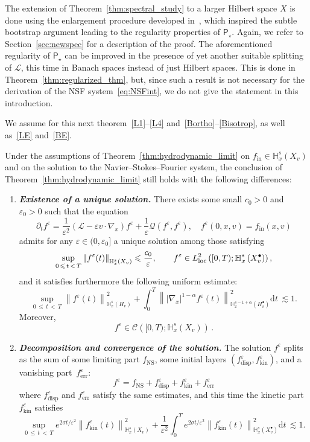 \documentclass[AHL,Unicode,longabstracts,published]{cedram}
\newcommand{\ini}{\mathrm{in}}
\newcommand{\err}{\mathrm{err}}
\newcommand{\ns}{\mathrm{NS}}
\newcommand{\kin}{\mathrm{kin}}
\renewcommand{\d}{\mathrm{d}}
\newcommand{\disp}{\mathrm{disp}}
\newcommand{\bbH}{\mathbb{H}}
\newcommand{\CC}{\mathcal{C}}
\newcommand{\LL}{\mathcal{L}}
\newcommand{\PP}{\mathsf{P}}
\newcommand{\QQ}{\mathcal{Q}}
\newcommand{\Ss}{H}
\newcommand{\Ssp}{H^{\bullet}}
\newcommand{\Sl}{X}
\newcommand{\Slp}{X^{\bullet}}
\renewcommand*\le{\leqslant}
\newcommand*\eps{{\varepsilon}}
\newcommand*{\relabel}{\renewcommand{\labelenumi}{(\theenumi)}}
\newcommand*{\bfenumi}{\renewcommand*{\theenumi}{\textit{\textbf{\arabic{enumi}}}}\relabel}
\begin{document}
The extension of Theorem~\ref{thm:spectral_study} to a larger Hilbert space $\Sl$ is done using the enlargement procedure developed in~\cite{GMM2017}, which inspired the subtle bootstrap argument leading to the regularity properties of $\PP_\star$. Again, we refer to Section~\ref{sec:newspec} for a description of the proof. {The aforementioned regularity of $\PP_\star$ can be improved in the presence of yet another suitable splitting of $\LL$, this time in Banach spaces instead of just Hilbert spaces}. This is done in Theorem~\ref{thm:regularized_thm}, but, since such a result is not necessary for the derivation of the NSF system~\eqref{eq:NSFint}, we do not give the statement in this introduction.

We assume for this next theorem~\eqref{L1}--\eqref{L4} and~\eqref{Bortho}--\eqref{Bisotrop}, as well as~\eqref{LE} and~\eqref{BE}.

\begin{theo}\label{thm:hydrodynamic_limit-gen_symmetric}
Under the assumptions of Theorem~\ref{thm:hydrodynamic_limit} {on $f_\ini \in \bbH^s_x \left(\Sl_v \right)$} and on the solution to the Navier--Stokes--Fourier system, {the conclusion of Theorem~\ref{thm:hydrodynamic_limit} still holds with the following differences:}
\begin{enumerate}\bfenumi
\item\label{theo1.20.1} \textit{\textbf{Existence of a unique solution.}} There exists some small $c_0 > 0$ and $\eps_0 > 0$ such that the equation
\[
\partial_t f^\eps = \frac{1}{\eps^2} \left(\LL - \eps v \cdot \nabla_x \right) f^\eps + \frac{1}{\eps} \QQ\left(f^\eps, f^\eps \right), \quad f^\eps(0, x, v) = f_\ini(x, v)
\]
admits for any $\eps \in (0, \eps_0]$ a unique solution among those satisfying
\[
\sup_{0\, \le\,t\,<\,T} \left\| f^\eps(t) \right\|_{ \bbH^s_x \left(\Sl_v \right) } \le \frac{c_0}{\eps}, \qquad f^\eps \in L^2_{\rm{loc}} \left([0, T) ; \bbH^s_x \left(\Slp_v\right) \right),
\]
and it satisfies furthermore the following uniform estimate:
\[
\sup_{0\,\le\,t\,<\,T} \left\| f^\eps(t) \right\|_{ \bbH^s_x \left(\Ss_v \right) }^2 + \int_0^T\left\| | \nabla_x |^{1-\alpha } f^\eps(t)\right\|_{ \bbH^{s-1+\alpha}_x \left(\Ssp_v \right) }^2 \d t \, \lesssim 1.
\]
Moreover,
\[
f^\eps \in\CC\left([0, T) ; \bbH^s_x \left(\Sl_v \right) \right)\,.
\]
\item\label{theo1.20.2} \textit{\textbf{Decomposition and convergence of the solution.}} The solution $f^\eps$ splits as the sum of some limiting part $f_\ns$, some initial layers $(f^\eps_\disp, f^\eps_\kin)$, and a vanishing part~$f^\eps_\err$:
\[
f^\eps = f_\ns + f^\eps_\disp + f^\eps_\kin + f^\eps_\err
\]
where $f^\eps_\disp$ and $f^\eps_\err$ satisfy the same estimates, and this time the kinetic part $f^\eps_\kin$ satisfies
\[
\sup_{0\,\le\,t\,<\,T} e^{2 \sigma t / \eps^2} \left\| f^\eps_\kin(t) \right\|_{ \bbH^s_x \left(\Sl_v \right) }^2 + \frac{1}{\eps^2} \int_0^T e^{2 \sigma t / \eps^2} \left\| f^\eps_\kin(t) \right\|_{ \bbH^s_x \left(\Slp_v \right) }^2 \d t \, {\lesssim 1}.
\]
\end{enumerate}
\end{theo}
\end{document}
